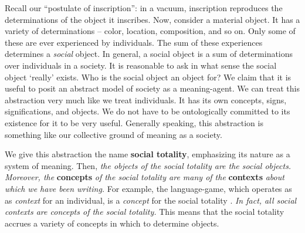 Recall our ``postulate of inscription'': in a vacuum, inscription reproduces the determinations of the object it inscribes.
Now, consider a material object. It has a variety of determinations -- color, location, composition, and so on. Only some of these are ever experienced by individuals. The sum of these experiences determines a \textit{social} object. In general, a social object is a sum of determinations over individuals in a society. It is reasonable to ask in what sense the social object `really' exists. Who is the social object an object for? We claim that it is useful to posit an abstract model of society as a meaning-agent. We can treat this abstraction very much like we treat individuals. It has its own concepts, signs, significations, and objects. We do not have to be ontologically committed to its existence for it to be very useful. Generally speaking, this abstraction is something like our collective ground of meaning as a society.

We give this abstraction the name \textbf{social totality}, emphasizing its nature as a system of meaning. Then, \textit{the objects of the social totality are the social objects.} \textit{Moreover, the }\textbf{concepts}\textit{ of the social totality are many of the }\textbf{contexts}\textit{ about which we have been writing.} For example, the language-game, which operates as as \textit{context} for an individual, is a \textit{concept} for the social totality \citep{Gadamer:TruthAndMethod, Heidegger:BeingAndTime}. \textit{In fact, all social contexts are concepts of the social totality.} This means that the social totality accrues a variety of concepts in which to determine objects.


